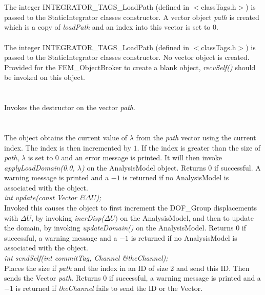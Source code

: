  \\
\\ 
The integer INTEGRATOR\_TAGS\_LoadPath (defined in
$<$classTags.h$>$) is passed to the StaticIntegrator classes
constructor. A vector object {\em path} is created which is a copy of
{\em loadPath} and an index into this vector is set to $0$.\\

\\ 
The integer INTEGRATOR\_TAGS\_LoadPath (defined in $<$classTags.h$>$) is
passed to the StaticIntegrator classes constructor. No vector object
is created. Provided for the FEM\_ObjectBroker to create a blank
object, {\em recvSelf()} should be invoked on this object. \\

 \\
\\ 
Invokes the destructor on the vector {\em path}. \\

\\
 \\
The object obtains the current value of $\lambda$ from the {\em path}
vector using the current index. The index is then incremented by
$1$. If the index is greater than the size of {\em path}, $\lambda$ is
set to $0$ and an error message is printed. It will then invoke
{\em applyLoadDomain(0.0, $\lambda$)} on the AnalysisModel
object. Returns $0$ if successful. A warning message is printed and a
$-1$ is returned if no AnalysisModel is associated with the object. \\

{\em int update(const Vector \&$\Delta U$);} \\
Invoked this causes the object to first increment the DOF\_Group
displacements with $\Delta U$, by invoking {\em incrDisp($\Delta U)$}
on the AnalysisModel, and then to update the domain, by invoking {\em
updateDomain()} on the AnalysisModel. Returns $0$ if successful, a
warning message and a $-1$ is returned if no AnalysisModel is
associated with the object. \\


{\em int sendSelf(int commitTag, Channel \&theChannel); } \\ 
Places the size if {\em path} and the index in an ID of size 2 and send this
ID. Then sends the Vector {\em path}. Returns $0$ if successful, a
warning message is printed and a $-1$ is returned if {\em theChannel}
fails to send the ID or the Vector. \\ 

